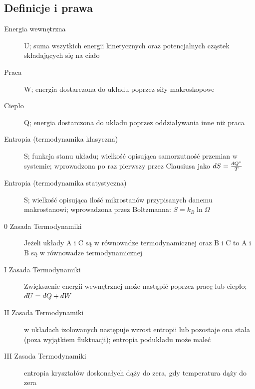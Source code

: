 \documentclass[10pt, a4paper, twoside, onecolumn]{article}
\numberwithin{equation}{section}
\newcommand{\dbar}{d\hspace*{-0.08em}\bar{}\hspace*{0.1em}}
\begin{document}
	\subsection{Definicje i prawa}
	\begin{description}
		\item[Energia wewnętrzna] U; suma wszytkich energii kinetycznych oraz potencjalnych cząstek składających się na ciało
		\item[Praca] W; energia dostarczona do układu poprzez siły makroskopowe
		\item[Ciepło] Q; energia dostarczona do układu poprzez oddziaływania inne niż praca
		\item[Entropia (termodynamika klasyczna)] S; funkcja stanu układu; wielkość opisująca samorzutność przemian w systemie; wprowadzona po raz pierwszy przez Clausiusa jako \(dS=\frac{\dbar Q^\circ}{T}\) \cite{orlik}
		\item[Entropia (termodynamika statystyczna)] S; wielkość opisująca ilość mikrostanów przypisanych danemu makrostanowi; wprowadzona przez Boltzmanna: \(S=k_B\ln{\Omega}\) \cite{landau}
		\item[0 Zasada Termodynamiki] Jeżeli układy A i C są w równowadze termodynamicznej oraz B i C to A i B są w równowadze termodynamicznej
		\item[I Zasada Termodynamiki] Zwiększenie energii wewnętrznej może nastąpić poprzez pracę lub ciepło; \(dU=\dbar Q+\dbar W\)
		\item[II Zasada Termodynamiki] w układach izolowanych następuje wzrost entropii lub pozostaje ona stała (poza wyjątkiem fluktuacji); entropia podukładu może maleć \cite{landau}
		\item[III Zasada Termodynamiki] entropia kryształów doskonałych dąży do zera, gdy temperatura dąży do zera
	\end{description}
\end{document}
